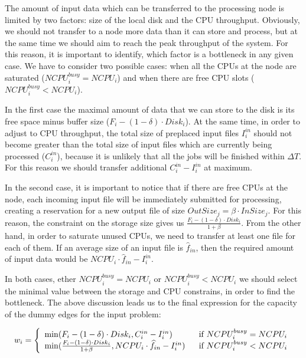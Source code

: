 \documentclass{svjour3}                     %
\begin{document}
The amount of input data which can be transferred to the processing node is limited by two factors: size of the local disk and the CPU throughput. Obviously, we should not transfer to a node more data than it can store and process, but at the same time we should aim to reach the peak throughput of the system. For this reason, it is important to identify, which factor is a bottleneck in any given case. We have to consider two possible cases: when all the CPUs at the node are saturated ($NCPU_{i}^{busy} = NCPU_{i}$) and when there are free CPU slots ($NCPU_{i}^{busy} < NCPU_{i}$). 

In the first case the maximal amount of data that we can store to the disk is its free space minus buffer size ($F_{i} -  (1 - \delta) \cdot Disk_{i}$). At the same time, in order to adjust to CPU throughput, the total size of preplaced input files $I_{i}^{in}$ should not become greater than the total size of input files which are currently being processed ($C_{i}^{in}$), because it is unlikely that all the jobs will be finished within $\Delta T$. For this reason we should transfer additional $C_{i}^{in} - I_{i}^{in} $ at maximum.

In the second case, it is important to notice that if there are free CPUs at the node, each incoming input file will be immediately submitted for processing, creating a reservation for a new output file of size  $OutSize_{j} = \beta \cdot InSize_{j}$. For this reason, the constraint on the storage size gives us $\frac{F_{i} -   (1 - \delta) \cdot Disk_{i}}{1 + \beta}$. From the other hand, in order to saturate unused CPUs, we need to transfer at least one file for each of them. If an average size of an input file is $\widehat{f}_{in}$, then the required amount of input data would be $NCPU_{i} \cdot \widehat{f}_{in} - I_{i}^{in}$. 

In both cases, ether $NCPU_{i}^{busy} = NCPU_{i}$ or $NCPU_{i}^{busy} < NCPU_{i}$ we should select the minimal value between the storage and CPU constrains, in order to find the bottleneck. The above discussion leads us to the final expression for the capacity of the dummy edges for the input problem:

\begin{equation}
w_{i} =\left\{ 
\begin{array}{l l}
\min(F_{i} -  (1 - \delta) \cdot Disk_{i} , 
C_{i}^{in} - I_{i}^{in}) & \ \ \text{if }  NCPU_{i}^{busy} = NCPU_{i} \\
\min(\frac{F_{i} -   (1 - \delta) \cdot Disk_{i}}{1 + \beta},
NCPU_{i} \cdot \widehat{f}_{in} - I_{i}^{in}) & \ \ \text{if }  NCPU_{i}^{busy} < NCPU_{i}

 \end{array} \right.
\label{w}
\end{equation}
\end{document}
